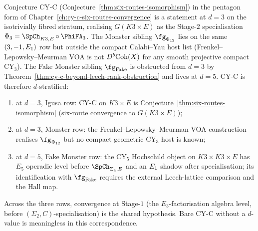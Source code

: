 \begin{conjecture}
\label{cor:cy-c-beyond-cy-c-d-stratified}
\ClaimStatusConjectured
Conjecture CY-C (Conjecture~\ref{thm:six-routes-isomorphism}) in the
pentagon form of Chapter~\ref{ch:cy-c-six-routes-convergence} is a
statement at $d = 3$ on the isotrivially fibred stratum, realising
$G(K3 \times E)$ as the Stage-$2$ specialisation
$\Phi_3 = \SpCh_{K3, E} \circ \PhiFA_3$. The Monster sibling
$\fg_{\Phi_{12}}$ lies on the same $(3, -1, E_{1})$ row but outside
the compact Calabi--Yau host list (Frenkel--Lepowsky--Meurman VOA is
not $D^b\mathrm{Coh}(X)$ for any smooth projective compact CY$_3$). The Fake
Monster sibling $\fg_{\mathrm{Fake}}$ is obstructed from $d = 3$ by
Theorem~\ref{thm:cy-c-beyond-leech-rank-obstruction} and lives at
$d = 5$. CY-C is therefore
$d$-stratified:
\begin{enumerate}[label=\textup{(\roman*)}]
 \item at $d = 3$, Igusa row: CY-C on $K3 \times E$ is
 Conjecture~\ref{thm:six-routes-isomorphism}
 (six-route convergence to $G(K3 \times E)$);
 \item at $d = 3$, Monster row: the Frenkel--Lepowsky--Meurman
 VOA construction realises $\fg_{\Phi_{12}}$ but no compact
 geometric CY$_3$ host is known;
 \item at $d = 5$, Fake Monster row: the CY$_5$ Hochschild object on
 $K3 \times K3 \times E$ has $E_5$ operadic level before
 $\SpCh_{\Sigma_4,E}$ and an $E_{1}$ shadow after specialisation; its
 identification with $\fg_{\mathrm{Fake}}$ requires the external
 Leech-lattice comparison and the Hall map.
\end{enumerate}
Across the three rows, convergence at Stage-$1$ (the
$E_3$-factorisation algebra level, before $(\Sigma_2, C)$-specialisation)
is the shared hypothesis. Bare CY-C without a $d$-value is meaningless
in this correspondence.
\end{conjecture}

